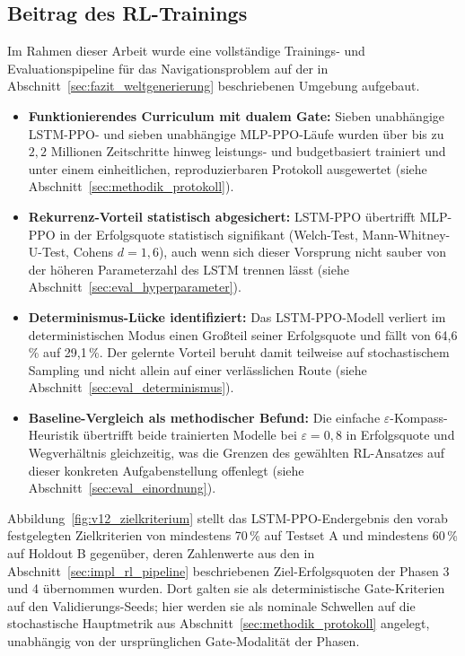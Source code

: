 \documentclass[
  a4paper,
  11pt,
  twoside,
  BCOR=8mm,           %
  headings=big,
  numbers=noenddot,
  listof=totoc,       %
  captions=tableheading,
]{scrreprt}
\begin{document}
\subsection{Beitrag des RL-Trainings}
\label{sec:fazit_rl}
Im Rahmen dieser Arbeit wurde eine vollständige Trainings- und Evaluationspipeline für das Navigationsproblem auf der in Abschnitt~\ref{sec:fazit_weltgenerierung} beschriebenen Umgebung aufgebaut.

\begin{itemize}
    \item \textbf{Funktionierendes Curriculum mit dualem Gate:} Sieben unabhängige LSTM-PPO- und sieben unabhängige MLP-PPO-Läufe wurden über bis zu $2{,}2$ Millionen Zeitschritte hinweg leistungs- und budgetbasiert trainiert und unter einem einheitlichen, reproduzierbaren Protokoll ausgewertet (siehe Abschnitt~\ref{sec:methodik_protokoll}).
    \item \textbf{Rekurrenz-Vorteil statistisch abgesichert:} LSTM-PPO übertrifft MLP-PPO in der Erfolgsquote statistisch signifikant (Welch-Test, Mann-Whitney-U-Test, Cohens $d = 1{,}6$), auch wenn sich dieser Vorsprung nicht sauber von der höheren Parameterzahl des LSTM trennen lässt (siehe Abschnitt~\ref{sec:eval_hyperparameter}).
    \item \textbf{Determinismus-Lücke identifiziert:} Das LSTM-PPO-Modell verliert im deterministischen Modus einen Großteil seiner Erfolgsquote und fällt von 64,6\,\% auf 29,1\,\%. Der gelernte Vorteil beruht damit teilweise auf stochastischem Sampling und nicht allein auf einer verlässlichen Route (siehe Abschnitt~\ref{sec:eval_determinismus}).
    \item \textbf{Baseline-Vergleich als methodischer Befund:} Die einfache $\varepsilon$-Kompass-Heuristik übertrifft beide trainierten Modelle bei $\varepsilon=0{,}8$ in Erfolgsquote und Wegverhältnis gleichzeitig, was die Grenzen des gewählten RL-Ansatzes auf dieser konkreten Aufgabenstellung offenlegt (siehe Abschnitt~\ref{sec:eval_einordnung}).
\end{itemize}

Abbildung~\ref{fig:v12_zielkriterium} stellt das LSTM-PPO-Endergebnis den vorab festgelegten Zielkriterien von mindestens 70\,\% auf Testset A und mindestens 60\,\% auf Holdout B gegenüber, deren Zahlenwerte aus den in Abschnitt~\ref{sec:impl_rl_pipeline} beschriebenen Ziel-Erfolgsquoten der Phasen 3 und 4 übernommen wurden. Dort galten sie als deterministische Gate-Kriterien auf den Validierungs-Seeds; hier werden sie als nominale Schwellen auf die stochastische Hauptmetrik aus Abschnitt~\ref{sec:methodik_protokoll} angelegt, unabhängig von der ursprünglichen Gate-Modalität der Phasen.
\end{document}
